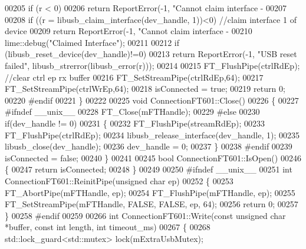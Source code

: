 \begin{DoxyCode}
{00205     \textcolor{keywordflow}{if} (r < 0)
00206         \textcolor{keywordflow}{return} ReportError(-1, \textcolor{stringliteral}{"Cannot claim interface - %
00207 
00208     \textcolor{keywordflow}{if} ((r = libusb\_claim\_interface(dev\_handle, 1))<0) \textcolor{comment}{//claim interface 1 of device}
00209         \textcolor{keywordflow}{return} ReportError(-1, \textcolor{stringliteral}{"Cannot claim interface - %
00210     lime::debug(\textcolor{stringliteral}{"Claimed Interface"});
00211 
00212     \textcolor{keywordflow}{if} (libusb\_reset\_device(dev\_handle)!=0)
00213         \textcolor{keywordflow}{return} ReportError(-1, \textcolor{stringliteral}{"USB reset failed"}, libusb\_strerror(libusb\_error(r)));
00214 
00215     FT\_FlushPipe(ctrlRdEp);  \textcolor{comment}{//clear ctrl ep rx buffer}
00216     FT\_SetStreamPipe(ctrlRdEp,64);
00217     FT\_SetStreamPipe(ctrlWrEp,64);
00218     isConnected = \textcolor{keyword}{true};
00219     \textcolor{keywordflow}{return} 0;
00220 \textcolor{preprocessor}{#endif}
00221 \}
00222 
00225 \textcolor{keywordtype}{void} ConnectionFT601::Close()
00226 \{
00227 \textcolor{preprocessor}{#ifndef \_\_unix\_\_}
00228     FT\_Close(mFTHandle);
00229 \textcolor{preprocessor}{#else}
00230     \textcolor{keywordflow}{if}(dev\_handle != 0)
00231     \{
00232         FT\_FlushPipe(streamRdEp);
00233         FT\_FlushPipe(ctrlRdEp);
00234         libusb\_release\_interface(dev\_handle, 1);
00235         libusb\_close(dev\_handle);
00236         dev\_handle = 0;
00237     \}
00238 \textcolor{preprocessor}{#endif}
00239     isConnected = \textcolor{keyword}{false};
00240 \}
00241 
00245 \textcolor{keywordtype}{bool} ConnectionFT601::IsOpen()
00246 \{
00247     \textcolor{keywordflow}{return} isConnected;
00248 \}
00249 
00250 \textcolor{preprocessor}{#ifndef \_\_unix\_\_}
00251 \textcolor{keywordtype}{int} ConnectionFT601::ReinitPipe(\textcolor{keywordtype}{unsigned} \textcolor{keywordtype}{char} ep)
00252 \{
00253     FT\_AbortPipe(mFTHandle, ep);
00254     FT\_FlushPipe(mFTHandle, ep);
00255     FT\_SetStreamPipe(mFTHandle, FALSE, FALSE, ep, 64);
00256     \textcolor{keywordflow}{return} 0;
00257 \}
00258 \textcolor{preprocessor}{#endif}
00259 
00266 \textcolor{keywordtype}{int} ConnectionFT601::Write(\textcolor{keyword}{const} \textcolor{keywordtype}{unsigned} \textcolor{keywordtype}{char} *buffer, \textcolor{keyword}{const} \textcolor{keywordtype}{int} length, \textcolor{keywordtype}{int} 
      timeout_ms)
00267 \{
00268     std::lock\_guard<std::mutex> lock(mExtraUsbMutex);
}}}
\end{DoxyCode}
